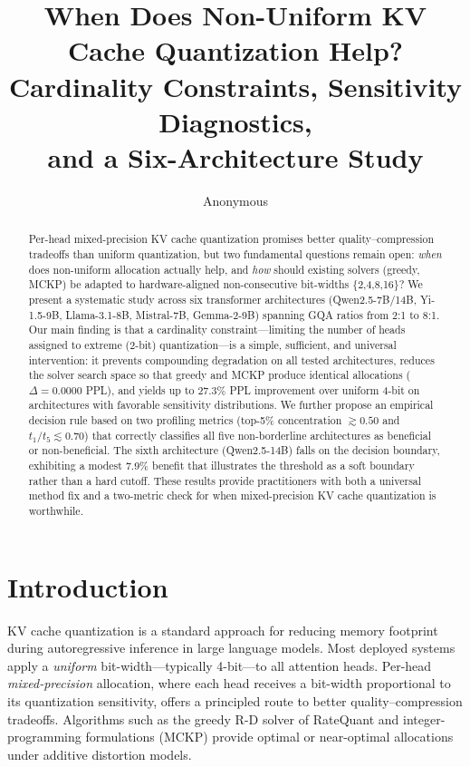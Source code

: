 \documentclass[11pt,a4paper]{article}
\title{When Does Non-Uniform KV Cache Quantization Help?\\
Cardinality Constraints, Sensitivity Diagnostics,\\and a Six-Architecture Study}
\author{Anonymous}
\date{}
\begin{document}
\maketitle

\begin{abstract}
Per-head mixed-precision KV cache quantization promises better quality--compression tradeoffs than uniform quantization, but two fundamental questions remain open: \emph{when} does non-uniform allocation actually help, and \emph{how} should existing solvers (greedy, MCKP) be adapted to hardware-aligned non-consecutive bit-widths \{2,4,8,16\}?
We present a systematic study across six transformer architectures (Qwen2.5-7B/14B, Yi-1.5-9B, Llama-3.1-8B, Mistral-7B, Gemma-2-9B) spanning GQA ratios from 2:1 to 8:1.
Our main finding is that a cardinality constraint---limiting the number of heads assigned to extreme (2-bit) quantization---is a simple, sufficient, and universal intervention: it prevents compounding degradation on all tested architectures, reduces the solver search space so that greedy and MCKP produce identical allocations ($\Delta=0.0000$ PPL), and yields up to 27.3\% PPL improvement over uniform 4-bit on architectures with favorable sensitivity distributions.
We further propose an empirical decision rule based on two profiling metrics (top-5\% concentration $\gtrsim 0.50$ and $t_1/t_5 \lesssim 0.70$) that correctly classifies all five non-borderline architectures as beneficial or non-beneficial.
The sixth architecture (Qwen2.5-14B) falls on the decision boundary, exhibiting a modest 7.9\% benefit that illustrates the threshold as a soft boundary rather than a hard cutoff.
These results provide practitioners with both a universal method fix and a two-metric check for when mixed-precision KV cache quantization is worthwhile.
\end{abstract}

\section{Introduction}

KV cache quantization is a standard approach for reducing memory footprint during autoregressive inference in large language models.
Most deployed systems apply a \emph{uniform} bit-width---typically 4-bit---to all attention heads.
Per-head \emph{mixed-precision} allocation, where each head receives a bit-width proportional to its quantization sensitivity, offers a principled route to better quality--compression tradeoffs.
Algorithms such as the greedy R-D solver of RateQuant and integer-programming formulations (MCKP) provide optimal or near-optimal allocations under additive distortion models.
\end{document}
